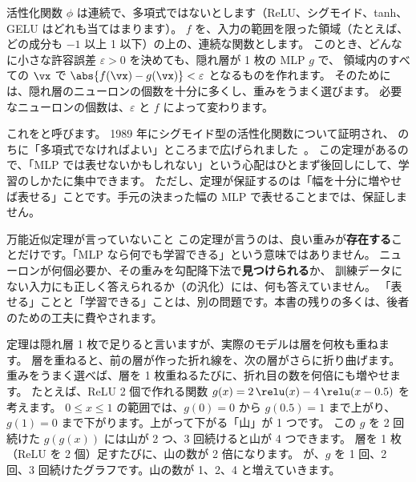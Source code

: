 \begin{theorem}[万能近似定理]\label{thm:nn-universal}
活性化関数 $\phi$ は連続で、多項式ではないとします（ReLU、シグモイド、tanh、GELU はどれも当てはまります）。
$f$ を、入力の範囲を限った領域（たとえば、どの成分も $-1$ 以上 1 以下）の上の、連続な関数とします。
このとき、どんなに小さな許容誤差 $\varepsilon>0$ を決めても、隠れ層が 1 枚の MLP $g$ で、
領域内のすべての $\vx$ で $\abs{f(\vx)-g(\vx)}<\varepsilon$ となるものを作れます。
そのためには、隠れ層のニューロンの個数を十分に多くし、重みをうまく選びます。
必要なニューロンの個数は、$\varepsilon$ と $f$ によって変わります。
\end{theorem}

これをと呼びます。
1989 年にシグモイド型の活性化関数について証明され\cite{cybenko1989approximation,hornik1989multilayer}、
のちに「多項式でなければよい」ところまで広げられました~\cite{leshno1993multilayer}。
この定理があるので、「MLP では表せないかもしれない」という心配はひとまず後回しにして、学習のしかたに集中できます。
ただし、定理が保証するのは「幅を十分に増やせば表せる」ことです。手元の決まった幅の MLP で表せることまでは、保証しません。

\begin{caution}{万能近似定理が言っていないこと}
この定理が言うのは、良い重みが\textbf{存在する}ことだけです。「MLP なら何でも学習できる」という意味ではありません。
ニューロンが何個必要か、その重みを勾配降下法で\textbf{見つけられる}か、
訓練データにない入力にも正しく答えられるか（の汎化）には、何も答えていません。
「表せる」ことと「学習できる」ことは、別の問題です。本書の残りの多くは、後者のための工夫に費やされます。
\end{caution}

定理は隠れ層 1 枚で足りると言いますが、実際のモデルは層を何枚も重ねます。
層を重ねると、前の層が作った折れ線を、次の層がさらに折り曲げます。
重みをうまく選べば、層を 1 枚重ねるたびに、折れ目の数を何倍にも増やせます。
たとえば、ReLU 2 個で作れる関数 $g(x)=2\,\relu(x)-4\,\relu(x-0.5)$ を考えます。
$0\le x\le 1$ の範囲では、$g(0)=0$ から $g(0.5)=1$ まで上がり、$g(1)=0$ まで下がります。上がって下がる「山」が 1 つです。
この $g$ を 2 回続けた $g(g(x))$ には山が 2 つ、3 回続けると山が 4 つできます。
層を 1 枚（ReLU を 2 個）足すたびに、山の数が 2 倍になります。
が、$g$ を 1 回、2 回、3 回続けたグラフです。山の数が 1、2、4 と増えていきます。

